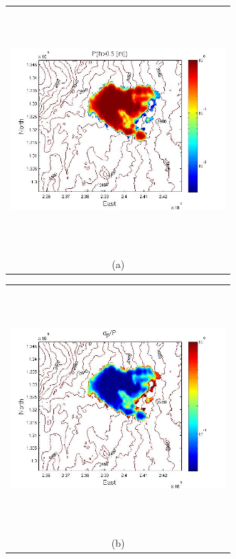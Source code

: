 \documentclass[12pt]{article}
\newcommand{\Pic}[2][0.85]{\begin{center}\texttt{[image: \#2]}
 \end{center} }
\begin{document}
\begin{figure}[H]
    \begin{minipage}[b]{0.6\textwidth}
        \begin{tabular}{c}
       \includegraphics[width=8cm,height=9cm,keepaspectratio]{Galeras_0_P_5m.jpg}\\
        (a)
        \end{tabular}
    \end{minipage}
    \begin{minipage}{0.6\textwidth}
        \begin{tabular}{c}
	\includegraphics[width=8cm,height=9cm,keepaspectratio]{Galeras_0_sigma_5m.jpg}\\
        (b)
        \end{tabular}

\end{minipage}
\end{figure}
\end{document}
